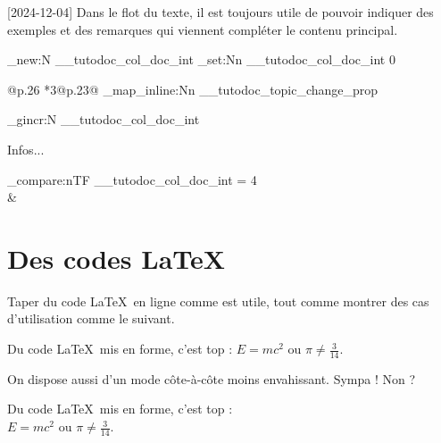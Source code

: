 \documentclass[theme = color]{../main/main}
\newcommand\myexrmktext{
    \tdocversion{1.7.0}[2024-12-04]
    Dans le flot du texte, il est toujours utile de pouvoir indiquer des exemples et des remarques qui viennent compléter le contenu principal.
}
\begin{document}
\medskip

\myexrmktext

\ExplSyntaxOn

\int_new:N  \g__tutodoc_col_doc_int
\int_set:Nn \g__tutodoc_col_doc_int { 0 }

\begin{tabular}{%
	@{\hskip 0pt}p{.26\linewidth}%
	*{3}{@{\hskip 7pt}p{.23\linewidth}}@{\hskip 0pt}%
}
	\prop_map_inline:Nn \g__tutodoc_topic_change_prop {
      \int_gincr:N \g__tutodoc_col_doc_int
      \vspace{-15pt}
	  \begin{tdoc#1}
       	\item Infos... 
	  \end{tdoc#1}
	    
	  \int_compare:nTF 
	    {\g__tutodoc_col_doc_int = 4 }
	    { \\ }
	    { & }
	}
\end{tabular}

\ExplSyntaxOff



\section{Des codes \LaTeX}

Taper du code \LaTeX\ en ligne comme  est utile, tout comme montrer des cas d'utilisation comme le suivant.

\begin{tdoclatex}
Du code \LaTeX\ mis en forme, c'est top : $E = m c^2$ ou $\pi \neq \frac{3}{14}$.
\end{tdoclatex}


On dispose aussi d'un mode côte-à-côte moins envahissant. Sympa ! Non ?

\begin{tdoclatex}[sbs]
Du code \LaTeX\ mis en forme, c'est top : \\
$E = m c^2$ ou $\pi \neq \frac{3}{14}$.
\end{tdoclatex}
\end{document}
